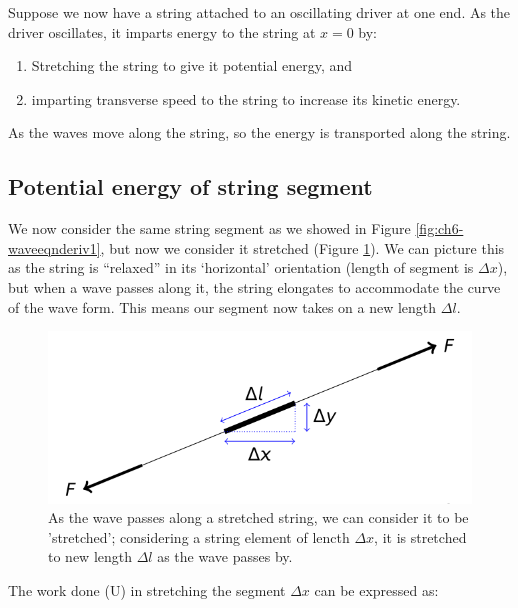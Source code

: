 \documentclass[
]{book}
\providecommand{\tightlist}{%
  \setlength{\itemsep}{0pt}\setlength{\parskip}{0pt}}
\begin{document}
Suppose we now have a string attached to an oscillating driver at one end. As the driver oscillates, it imparts energy to the string at \(x=0\) by:

\begin{enumerate}
\def\labelenumi{\arabic{enumi}.}
\tightlist
\item
  Stretching the string to give it potential energy, and
\item
  imparting transverse speed to the string to increase its kinetic energy.
\end{enumerate}

As the waves move along the string, so the energy is transported along the string.

\hypertarget{sec:ch7-peofstringsegment}{%
\subsection{Potential energy of string segment}\label{sec:ch7-peofstringsegment}}

We now consider the same string segment as we showed in Figure \ref{fig:ch6-waveeqnderiv1}, but now we consider it stretched (Figure \ref{fig:ch7-stretchedsegment1}). We can picture this as the string is ``relaxed'' in its `horizontal' orientation (length of segment is \(\Delta x\)), but when a wave passes along it, the string elongates to accommodate the curve of the wave form. This means our segment now takes on a new length \(\Delta l\).

\begin{figure}

{\centering \includegraphics[width=0.7\linewidth]{visualisations/LaTeX/ch7-peofstringsegment} 

}

\caption{As the wave passes along a stretched string, we can consider it to be 'stretched'; considering a string element of lencth $\Delta x$, it is stretched to new length $\Delta l$ as the wave passes by.}\label{fig:ch7-stretchedsegment1}
\end{figure}

The work done (\Delta U) in stretching the segment \(\Delta x\) can be expressed as:
\end{document}
